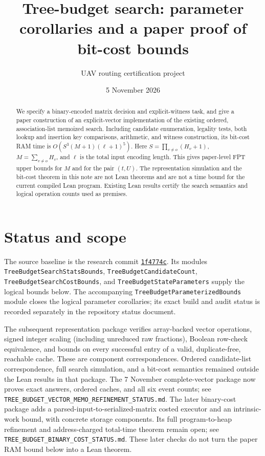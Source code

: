 \documentclass[11pt,a4paper]{article}
\title{Tree-budget search: parameter corollaries and a paper proof of bit-cost bounds}
\author{UAV routing certification project}
\date{5 November 2026}
\theoremstyle{definition}
\theoremstyle{remark}
\begin{document}
\maketitle
\begin{abstract}
We specify a binary-encoded matrix decision and explicit-witness task, and
give a paper construction of an explicit-vector implementation of the existing
ordered, association-list memoized search. Including candidate enumeration,
legality tests, both lookup and insertion key comparisons, arithmetic, and
witness construction, its bit-cost RAM time is
\(O(S^3(M+1)(\ell+1)^5)\).
Here \(S=\prod_{v\ne o}(H_v+1)\), \(M=\sum_{v\ne o}H_v\), and \(\ell\)
is the total input encoding length. This gives paper-level FPT upper bounds
for \(M\) and for the pair \((t,U)\). The representation simulation and the
bit-cost theorem in this note are not Lean theorems and are not a time bound
for the current compiled Lean program. Existing Lean results certify the
search semantics and logical operation counts used as premises.
\end{abstract}

\section{Status and scope}
The source baseline is the research commit
\href{https://github.com/huam54925-cpu/uav-routing-certification/commit/1f4774cfcb59c554893d37a9e4d476b0d2c8fa78}{\texttt{1f4774c}}.
Its modules \texttt{TreeBudget\allowbreak SearchStatsBounds},
\texttt{TreeBudget\allowbreak CandidateCount}, \texttt{TreeBudget\allowbreak SearchCostBounds}, and
\texttt{TreeBudget\allowbreak StateParameters} supply the logical bounds below.
The accompanying \texttt{TreeBudget\allowbreak ParameterizedBounds} module closes the
logical parameter corollaries; its exact build and audit status is recorded
separately in the repository status document.

The subsequent representation package verifies array-backed vector operations,
signed integer scaling (including unreduced raw fractions), Boolean row-check
equivalence, and bounds on every successful entry of a valid, duplicate-free,
reachable cache. These are component correspondences. Ordered candidate-list
correspondence, full search simulation, and a bit-cost semantics remained outside
the Lean results in that package. The 7 November complete-vector package now
proves exact answers, ordered caches, and all six event counts; see
\texttt{TREE\_BUDGET\_VECTOR\_MEMO\_REFINEMENT\_STATUS.md}.
The later binary-cost package adds a parsed-input-to-serialized-matrix costed
executor and an intrinsic-work bound, with concrete storage components.
Its full program-to-heap refinement and address-charged total-time theorem
remain open; see \texttt{TREE\_BUDGET\_BINARY\_COST\_STATUS.md}.
These later checks do not turn the paper RAM bound below into a Lean theorem.
\end{document}
